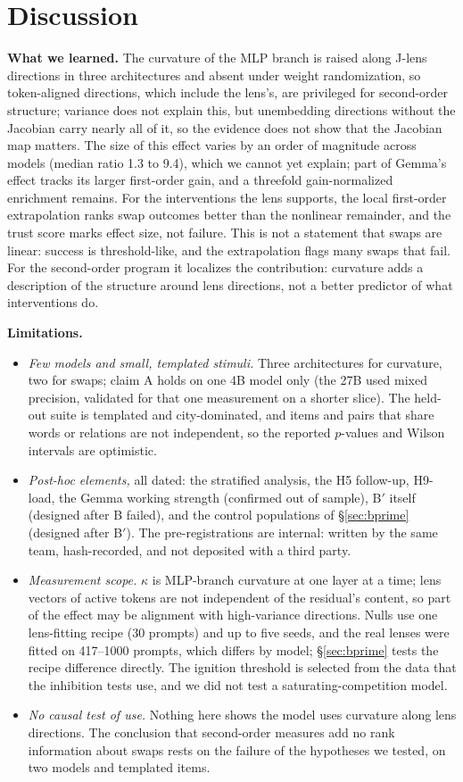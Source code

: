 \documentclass[10pt]{article}
\newcommand{\secref}[1]{\S\ref{#1}}
\begin{document}
\section{Discussion}
\textbf{What we learned.} The curvature of the MLP branch is raised along J-lens directions in three architectures and absent under weight randomization, so token-aligned directions, which include the lens's, are privileged for second-order structure; variance does not explain this, but unembedding directions without the Jacobian carry nearly all of it, so the evidence does not show that the Jacobian map matters. The size of this effect varies by an order of magnitude across models (median ratio 1.3 to 9.4), which we cannot yet explain; part of Gemma's effect tracks its larger first-order gain, and a threefold gain-normalized enrichment remains. For the interventions the lens supports, the local first-order extrapolation ranks swap outcomes better than the nonlinear remainder, and the trust score marks effect size, not failure. This is not a statement that swaps are linear: success is threshold-like, and the extrapolation flags many swaps that fail. For the second-order program it localizes the contribution: curvature adds a description of the structure around lens directions, not a better predictor of what interventions do.

\textbf{Limitations.}
\begin{itemize}
\item \emph{Few models and small, templated stimuli.} Three architectures for curvature, two for swaps; claim A holds on one 4B model only (the 27B used mixed precision, validated for that one measurement on a shorter slice). The held-out suite is templated and city-dominated, and items and pairs that share words or relations are not independent, so the reported $p$-values and Wilson intervals are optimistic.
\item \emph{Post-hoc elements,} all dated: the stratified analysis, the H5 follow-up, H9-load, the Gemma working strength (confirmed out of sample), B$'$ itself (designed after B failed), and the control populations of \secref{sec:bprime} (designed after B$'$). The pre-registrations are internal: written by the same team, hash-recorded, and not deposited with a third party.
\item \emph{Measurement scope.} $\kappa$ is MLP-branch curvature at one layer at a time; lens vectors of active tokens are not independent of the residual's content, so part of the effect may be alignment with high-variance directions. Nulls use one lens-fitting recipe (30 prompts) and up to five seeds, and the real lenses were fitted on 417--1000 prompts, which differs by model; \secref{sec:bprime} tests the recipe difference directly. The ignition threshold is selected from the data that the inhibition tests use, and we did not test a saturating-competition model.
\item \emph{No causal test of use.} Nothing here shows the model uses curvature along lens directions. The conclusion that second-order measures add no rank information about swaps rests on the failure of the hypotheses we tested, on two models and templated items.
\end{itemize}
\end{document}
